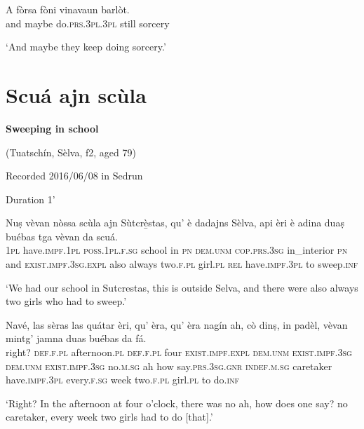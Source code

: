 \begin{linenumbers} 
\gll    A fòrsa fòni vinavaun barlòt. \\
and maybe do.\textsc{prs.3pl.3pl} still sorcery\\
\end{linenumbers}
\medskip
\glt `And maybe they keep doing sorcery.'

\clearpage

\section{Scuá ajn scùla}\label{sec:8.6}

\noindent
\textbf{Sweeping in school}

\noindent
(Tuatschín, Sèlva, f2, aged 79)

\noindent
Recorded 2016/06/08 in Sedrun

\noindent
Duration 1'

\bigskip

\begin{linenumbers}
\gll Nuṣ vèvan nòssa scùla ajn Sùtcrè̱stas, qu’ è dadajns Sèlva, api èri è adina duaṣ buébas tga vèvan da scuá. \\
  \textsc{1pl} have.\textsc{impf.1pl} \textsc{poss.1pl.f.sg} school in \textsc{pn} \textsc{dem.unm} \textsc{cop.prs.3sg} in\_interior \textsc{pn} and \textsc{exist.impf.3sg.expl} also always two.\textsc{f.pl} girl.\textsc{pl} \textsc{rel} have.\textsc{impf.3pl} to sweep.\textsc{inf}\\
 \end{linenumbers}
 \medskip
\glt `We had our school in Sutcrestas, this is outside Selva, and there were also always two girls who had to sweep.'
\medskip

\begin{linenumbers}
\gll   Navé, las sèras las quátar èri, qu' èra, qu’ èra nagín ah, cò dinṣ, in padèl, vèvan mintg’ jamna duas buébas da fá.\\
 right? \textsc{def.f.pl} afternoon.\textsc{pl} \textsc{def.f.pl} four \textsc{exist.impf.expl} \textsc{dem.unm} \textsc{exist.impf.3sg} \textsc{dem.unm} \textsc{exist.impf.3sg} no.\textsc{m.sg} ah how say.\textsc{prs.3sg.gnr} \textsc{indef.m.sg} caretaker have.\textsc{impf.3pl} every.\textsc{f.sg} week two.\textsc{f.pl} girl.\textsc{pl} to do.\textsc{inf}\\
\end{linenumbers}
\medskip
\glt `Right? In the afternoon at four o’clock, there was no ah, how does one say? no caretaker, every week two girls had to do [that].'
\medskip

